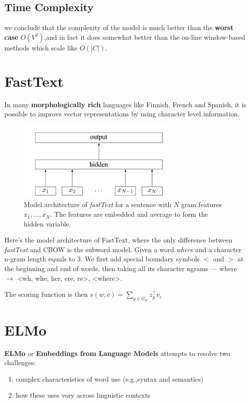 \documentclass[a4paper, 12pt]{book} %
\begin{document}
\subsection{Time Complexity}

we conclude that the complexity of the model is much better than the \textbf{worst case} $O(V^2)$,and in fact it does somewhat better than the on-line window-based methods which scale like $O(|C|)$.

\section{FastText}
In many \textbf{morphologically rich} languages like Finnish, French and Spanish, it is possible to improve vector representations by using character level information.

\begin{figure}[htpb]
	\centering
	\includegraphics[width=8cm]{figures/fasttext_model_architecture.png}
	\caption{Model architecture of \emph{fastText} for a sentence with $N$ gram features $x_1,...,x_N$. The features are embedded and average to form the hidden variable.}
	\label{fig:boat1}
\end{figure}


Here's the model architecture of FastText, where the only difference between \emph{fastText} and CBOW is the subword model. Given a word \emph{where} and a character n-gram length equals to $3$. We first add special boundary symbols $<$ and $>$ at the beginning and end of words, then taking all its character ngrams --- where $\to$ <wh, whe, her, ere, re>, <where>.

The scoring function is then $s(w,c)=\sum_{g\in G_w}{z_g^{\top}v_c}$ 


\section{ELMo}
\textbf{ELMo} or \textbf{Embeddings from Language Models} attempts to resolve two challenges:
\begin{enumerate}
	\item complex characteristics of word use (e.g.,syntax and semantics)
	\item how these uses vary across linguistic contexts \\
\end{enumerate} 
\end{document}
